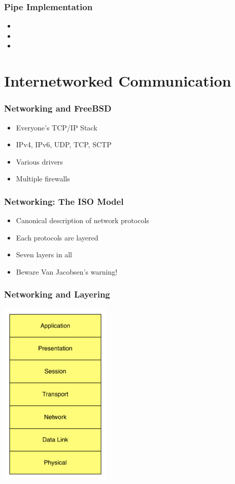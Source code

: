 \documentclass[pdftex]{beamer} %
\begin{document}
\begin{frame}
  \frametitle{Pipe Implementation}
  \begin{itemize}
  \item 
  \item 
  \item 
  \end{itemize}
\end{frame}

\section{Internetworked Communication}
\label{sec:internet}

\begin{frame}
  \frametitle{Networking and FreeBSD}
  \begin{itemize}
  \item Everyone's TCP/IP Stack
  \item IPv4, IPv6, UDP, TCP, SCTP
  \item Various drivers
  \item Multiple firewalls
  \end{itemize}
\end{frame}

\begin{frame}
  \frametitle{Networking: The ISO Model}
  \begin{itemize}
  \item Canonical description of network protocols
  \item Each protocols are layered
  \item Seven layers in all
  \item Beware Van Jacobsen's warning!
  \end{itemize}
\end{frame}

\begin{frame}
  \frametitle{Networking and Layering}
\centering
\includegraphics[width=0.4\textwidth]{../../figures/ISO-layers.pdf}
\end{frame}
\end{document}
